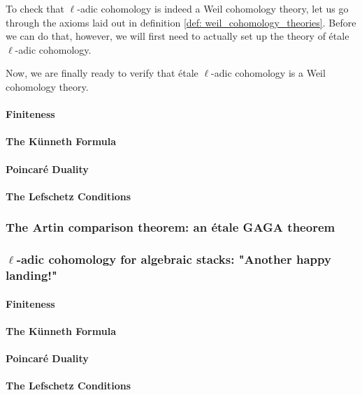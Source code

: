                 To check that $\ell$-adic cohomology is indeed a Weil cohomology theory, let us  go through the axioms laid out in definition \ref{def: weil_cohomology_theories}. Before we can do that, however, we will first need to actually set up the theory of \'etale $\ell$-adic cohomology.
                
                Now, we are finally ready to verify that \'etale $\ell$-adic cohomology is a Weil cohomology theory.
                \paragraph{Finiteness}
            
                \paragraph{The K\"unneth Formula}
                
                \paragraph{Poincar\'e Duality}
            
                \paragraph{The Lefschetz Conditions}
        
            \subsubsection{The Artin comparison theorem: an \'etale GAGA theorem}
            
            \subsubsection{\texorpdfstring{$\ell$}{}-adic cohomology for algebraic stacks: "Another happy landing!"}
                \paragraph{Finiteness}
            
                \paragraph{The K\"unneth Formula}
                
                \paragraph{Poincar\'e Duality}
            
                \paragraph{The Lefschetz Conditions}
                
    